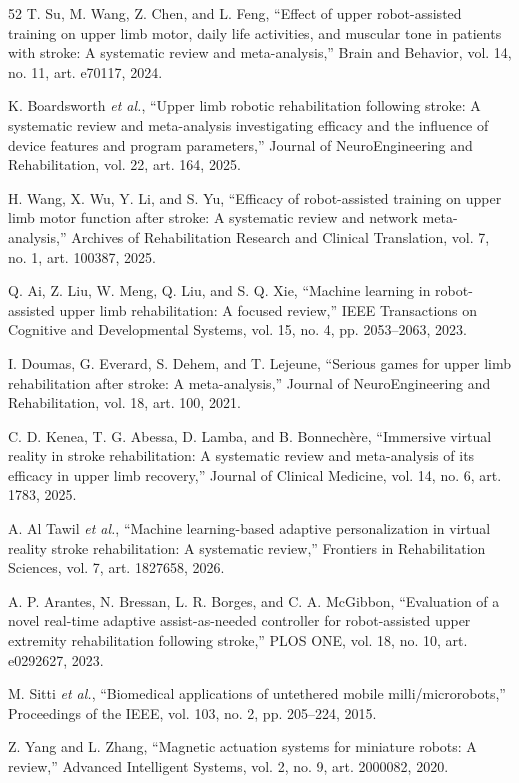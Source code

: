 \documentclass[journal,twoside,web]{ieeecolor2}
\begin{document}
\begin{thebibliography}{52}
 T. Su, M. Wang, Z. Chen, and L. Feng, ``Effect of upper robot-assisted training on upper limb motor, daily life activities, and muscular tone in patients with stroke: A systematic review and meta-analysis,'' Brain and Behavior, vol. 14, no. 11, art. e70117, 2024.

 K. Boardsworth \emph{et al.}, ``Upper limb robotic rehabilitation following stroke: A systematic review and meta-analysis investigating efficacy and the influence of device features and program parameters,'' Journal of NeuroEngineering and Rehabilitation, vol. 22, art. 164, 2025.

 H. Wang, X. Wu, Y. Li, and S. Yu, ``Efficacy of robot-assisted training on upper limb motor function after stroke: A systematic review and network meta-analysis,'' Archives of Rehabilitation Research and Clinical Translation, vol. 7, no. 1, art. 100387, 2025.

 Q. Ai, Z. Liu, W. Meng, Q. Liu, and S. Q. Xie, ``Machine learning in robot-assisted upper limb rehabilitation: A focused review,'' IEEE Transactions on Cognitive and Developmental Systems, vol. 15, no. 4, pp. 2053--2063, 2023.

 I. Doumas, G. Everard, S. Dehem, and T. Lejeune, ``Serious games for upper limb rehabilitation after stroke: A meta-analysis,'' Journal of NeuroEngineering and Rehabilitation, vol. 18, art. 100, 2021.

 C. D. Kenea, T. G. Abessa, D. Lamba, and B. Bonnechère, ``Immersive virtual reality in stroke rehabilitation: A systematic review and meta-analysis of its efficacy in upper limb recovery,'' Journal of Clinical Medicine, vol. 14, no. 6, art. 1783, 2025.

 A. Al Tawil \emph{et al.}, ``Machine learning-based adaptive personalization in virtual reality stroke rehabilitation: A systematic review,'' Frontiers in Rehabilitation Sciences, vol. 7, art. 1827658, 2026.

 A. P. Arantes, N. Bressan, L. R. Borges, and C. A. McGibbon, ``Evaluation of a novel real-time adaptive assist-as-needed controller for robot-assisted upper extremity rehabilitation following stroke,'' PLOS ONE, vol. 18, no. 10, art. e0292627, 2023.

 M. Sitti \emph{et al.}, ``Biomedical applications of untethered mobile milli/microrobots,'' Proceedings of the IEEE, vol. 103, no. 2, pp. 205--224, 2015.

 Z. Yang and L. Zhang, ``Magnetic actuation systems for miniature robots: A review,'' Advanced Intelligent Systems, vol. 2, no. 9, art. 2000082, 2020.


\end{thebibliography}
\end{document}
